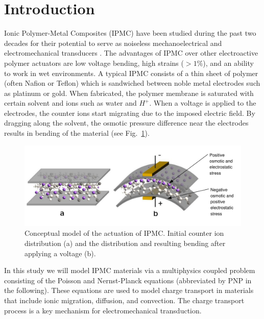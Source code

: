 \section{Introduction}

Ionic Polymer-Metal Composites (IPMC) have been studied during the past two 
decades for their potential to serve as noiseless mechanoelectrical and electromechanical 
transducers \cites{basu1997membrane,shahinpoor2001smartmat,
nasser2002applied,newbury2003intelligent, wallmersperger2007appliedphysics,
pugal2008appliedphysics,pugal2010polymer}.
The advantages of IPMC over other electroactive polymer actuators
are low voltage bending, high strains ($>1\%$), and an ability to work
in wet environments. A typical IPMC consists of a thin sheet of polymer
(often Nafion or Teflon) which is sandwiched between noble
metal electrodes such as platinum or gold. When fabricated, the polymer 
membrane is saturated with certain solvent and ions such as water and $H^+$.
When a voltage is applied to the electrodes, the counter ions start
migrating due to the imposed electric field. By dragging along the solvent,
the osmotic pressure difference near the electrodes
results in bending of the material (see Fig.~\ref{fig:conceptual}).
\begin{figure}[!ht]
  \begin{centering}
  \includegraphics[scale=0.7]{IPMC_bending}
  \caption{\label{fig:conceptual}Conceptual model of the actuation
 	of IPMC. Initial counter ion distribution (a) and
	the distribution and resulting bending after applying a voltage (b).}
  \end{centering}
\end{figure}

In this study we will model IPMC materials via a multiphysics coupled problem 
consisting of the Poisson and Nernst-Planck equations (abbreviated by PNP in
the following). These equations are used to model charge transport in materials 
that include ionic migration, diffusion, and convection. The charge transport 
process is a key mechanism for electromechanical transduction.

